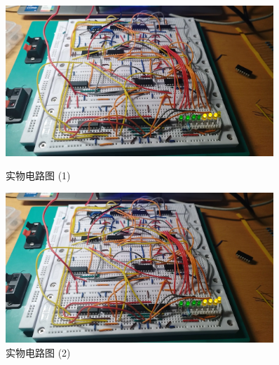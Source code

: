 \documentclass{ctexart}
\begin{document}
\begin{figure}[H]
    \centering
    \begin{minipage}{0.45\textwidth}
    \centering
    \includegraphics[width=0.9\textwidth]{实物电路图 (1).jpg}
    \caption{实物电路图 (1)}
    \label{}
    \end{minipage}
    \hspace{0.05\textwidth}
    \begin{minipage}{0.45\textwidth}
    \centering
    \includegraphics[width=0.9\textwidth]{实物电路图 (2).jpg}
    \caption{实物电路图 (2)}
    \label{7474}
    \end{minipage}
\end{figure}
\end{document}
